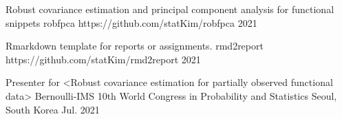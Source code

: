 \documentclass[11pt, a4paper]{awesome-cv} %
\begin{document}

\begin{cventries}
	\cventry
	{Robust covariance estimation and principal component analysis for functional snippets} %
	{robfpca} %
	{https://github.com/statKim/robfpca} %
	{2021} %
	{ %
	}
	
	\cventry
	{Rmarkdown template for reports or assignments.} %
	{rmd2report} %
	{https://github.com/statKim/rmd2report} %
	{2021} %
	{ %
	}
\end{cventries}




\begin{cventries}
	
	\cventry
	{Presenter for <Robust covariance estimation for partially observed functional data>} %
	{Bernoulli-IMS 10th World Congress in Probability and Statistics} %
	{Seoul, South Korea} %
	{Jul. 2021} %
	{ %
	}
	
\end{cventries}
\end{document}
